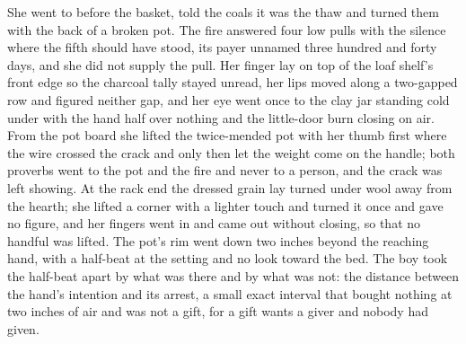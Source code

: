 She went to  before the basket, told the coals it was the thaw and turned them with the back of a broken pot. The fire answered four low pulls with the silence where the fifth should have stood, its payer unnamed three hundred and forty days, and she did not supply the pull. Her finger lay on top of the loaf shelf's front edge so the charcoal tally stayed unread, her lips moved along a two-gapped row and figured neither gap, and her eye went once to the clay jar standing cold under  with the hand half over nothing and the little-door burn closing on air. From the pot board she lifted the twice-mended pot with her thumb first where the wire crossed the crack and only then let the weight come on the handle; both proverbs went to the pot and the fire and never to a person, and the crack was left showing. At the rack end the dressed grain lay turned under wool away from the hearth; she lifted a corner with a lighter touch and turned it once and gave no figure, and her fingers went in and came out without closing, so that no handful was lifted. The pot's rim went down two inches beyond the reaching hand, with a half-beat at the setting and no look toward the bed. The boy took the half-beat apart by what was there and by what was not: the distance between the hand's intention and its arrest, a small exact interval that bought nothing at two inches of air and was not a gift, for a gift wants a giver and nobody had given.

